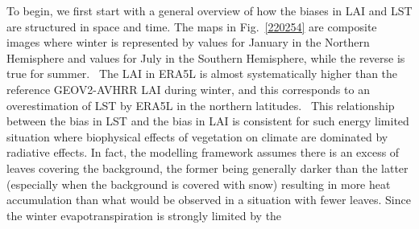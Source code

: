 \documentclass[gmd, manuscript]{copernicus}
\begin{document}
To begin, we first start with a general overview of how the biases in
LAI and LST are structured in space and time. The maps in
Fig.~{\ref{220254}} are composite images where winter
is represented by values for January in the Northern Hemisphere and
values for July in the Southern Hemisphere, while the reverse is true
for summer.~ The LAI in ERA5L is almost systematically higher than the
reference GEOV2-AVHRR LAI during winter, and this corresponds to an
overestimation of LST by ERA5L in the northern latitudes.~ This
relationship between the bias in LST and the bias in LAI is consistent
for such energy limited situation where biophysical effects of
vegetation on climate are dominated by radiative effects. In fact, the
modelling framework assumes there is an excess of leaves covering the
background, the former being generally darker than the latter
(especially when the background is covered with snow) resulting in more
heat accumulation than what would be observed in a situation with fewer
leaves. Since the winter evapotranspiration is strongly limited by the
\end{document}

